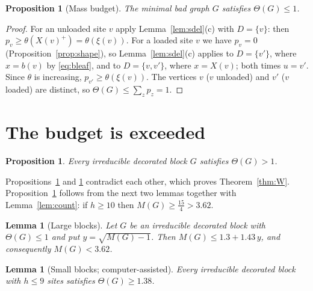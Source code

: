 \documentclass[11pt,a4paper]{article}
\newtheorem{lemma}[theorem]{Lemma}
\newtheorem{proposition}[theorem]{Proposition}
\theoremstyle{definition}
\theoremstyle{remark}
\numberwithin{equation}{section}
\begin{document}
\begin{proposition}[Mass budget]\label{prop:budget}
The minimal bad graph $G$ satisfies $\Theta(G)\le1$.
\end{proposition}
\begin{proof}
For an unloaded site $v$ apply Lemma~\ref{lem:sdel}(c) with $D=\{v\}$: then
$p_v\ge\theta(X(v)^+)=\theta(\xi(v))$. For a loaded site $v$ we have $p_v=0$
(Proposition~\ref{prop:shape}), so Lemma~\ref{lem:sdel}(c) applies to
$D=\{v'\}$, where $x=b(v)$ by \eqref{eq:bleaf}, and to $D=\{v,v'\}$, where
$x=X(v)$; both times $u=v'$. Since $\theta$ is increasing, $p_{v'}\ge\theta(\xi(v))$.
The vertices $v$
($v$ unloaded) and $v'$ ($v$ loaded) are distinct, so $\Theta(G)\le\sum_zp_z=1$.
\end{proof}

\section{The budget is exceeded}\label{sec:budget}

\begin{proposition}\label{prop:exceed}
Every irreducible decorated block $G$ satisfies $\Theta(G)>1$.
\end{proposition}

Propositions~\ref{prop:budget} and \ref{prop:exceed} contradict each other, which
proves Theorem~\ref{thm:W}. Proposition~\ref{prop:exceed} follows from the next two
lemmas together with Lemma~\ref{lem:count}: if $h\ge10$ then $M(G)\ge\frac{15}4>3.62$.

\begin{lemma}[Large blocks]\label{lem:A}
Let $G$ be an irreducible decorated block with $\Theta(G)\le1$ and put
$y=\sqrt{M(G)-1}$. Then $M(G)\le1.3+1.43\,y$, and consequently $M(G)<3.62$.
\end{lemma}

\begin{lemma}[Small blocks; computer-assisted]\label{lem:small}
Every irreducible decorated block with $h\le9$ sites satisfies
$\Theta(G)\ge1.38$.
\end{lemma}
\end{document}
